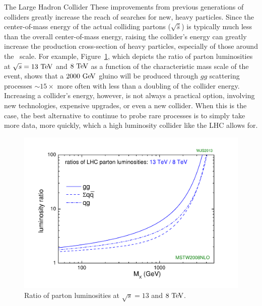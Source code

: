 \begin{section}{The Large Hadron Collider}
These improvements from previous generations of colliders greatly increase the reach of searches for new, heavy particles.
Since the center-of-mass energy of the actual colliding partons ($\sqrt{\hat{s}}$) is typically much less than the overall center-of-mass energy, raising the collider's energy can greatly increase the production cross-section of heavy particles, especially of those around the \TeV\ scale. 
For example, Figure~\ref{fig:parton_lumi}, which depicts the ratio of parton luminosities at $\sqrt{s} = 13~\mathrm{Te\kern -0.1em V}$ and $8~\mathrm{Te\kern -0.1em V}$ as a function of the characteristic mass scale of the event, shows that a $2000~\mathrm{Ge\kern -0.1em V}$ gluino will be produced through $gg$ scattering processes ${\sim}15\times$ more often with less than a doubling of the collider energy.
Increasing a collider's energy, however, is not always a practical option, involving new technologies, expensive upgrades, or even a new collider. When this is the case, the best alternative to continue to probe rare processes is to simply take more data, more quickly, which a high luminosity collider like the LHC allows for.


\begin{figure}[tbp!]
\begin{center}
\includegraphics[angle=0,width=0.80\columnwidth]{fig/parton_lumi.pdf}
\end{center}
\caption{Ratio of parton luminosities at $\sqrt{s} = 13$ and $8~\mathrm{Te\kern -0.1em V}$.~\cite{parton_lumi}}
\label{fig:parton_lumi}
\end{figure}


\end{section}


